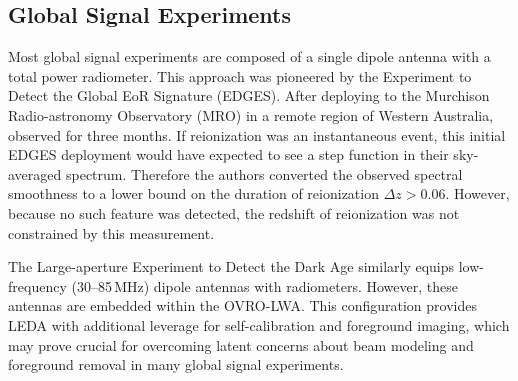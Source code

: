 \begin{bibunit}

\subsection{Global Signal Experiments}

Most global signal experiments are composed of a single dipole antenna with a total power
radiometer. This approach was pioneered by the Experiment to Detect the Global EoR Signature
(EDGES). After deploying to the Murchison Radio-astronomy Observatory (MRO) in a remote region of
Western Australia, \citet{2010Natur.468..796B} observed for three months. If reionization was an
instantaneous event, this initial EDGES deployment would have expected to see a step function in
their sky-averaged spectrum. Therefore the authors converted the observed spectral smoothness to a
lower bound on the duration of reionization $\Delta z > 0.06$. However, because no such feature was
detected, the redshift of reionization was not constrained by this measurement.

The Large-aperture Experiment to Detect the Dark Age \citep[LEDA;][]{2018MNRAS.478.4193P} similarly
equips low-frequency (30--85\,MHz) dipole antennas with radiometers. However, these antennas are
embedded within the OVRO-LWA.  This configuration provides LEDA with additional leverage for
self-calibration and foreground imaging, which may prove crucial for overcoming latent concerns
about beam modeling and foreground removal in many global signal experiments.

\citet{2017ApJ...845L..12S}


\end{bibunit}
